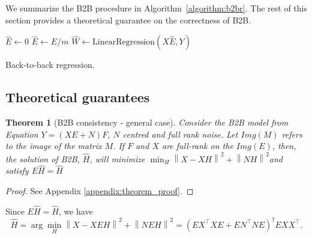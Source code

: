 \documentclass{article}
\newtheorem{theorem}{Theorem}
\begin{document}
%

We summarize the B2B procedure in Algorithm~\ref{algorithm:b2br}.
%
The rest of this section provides a theoretical guarantee on the correctness of B2B.


\begin{algorithm}[H]
    $\hat{E} \leftarrow 0$\;
    $\hat{E} \leftarrow \hat{E} / m$\;
    $\hat{W} \leftarrow \text{LinearRegression}(X \hat{E}, Y)$\;
    \caption{Back-to-back regression.}
    \label{algorithm:b2br}
\end{algorithm}

\subsection{Theoretical guarantees}
\label{sec:theorem}

\begin{theorem}[B2B consistency - general case]

     Consider the B2B model from Equation $Y = (XE + N)F$, $N$ centred and full rank noise.
     Let $Img(M)$ refers to the image of the matrix $M$. If $F$ and $X$ are full-rank on the $Img(E)$, then, the solution of B2B, $\hat H$, will minimize
     $\min_H  \left \| X - XH\right\| ^2  + \left \| NH\right \| ^2$and satisfy $E\hat H = \hat H$
\end{theorem}
%
\begin{proof}
  See Appendix \ref{appendix:theorem_proof}.
\end{proof}

Since  $E\hat H = \hat H$, we have
\begin{equation}
  \hat H = \arg \min_H  \left \| X - XEH\right\| ^2  + \left \| NEH\right \| ^2 = (E X^\top XE +EN^\top NE) ^\dagger EXX^\top.
\end{equation}
\end{document}
